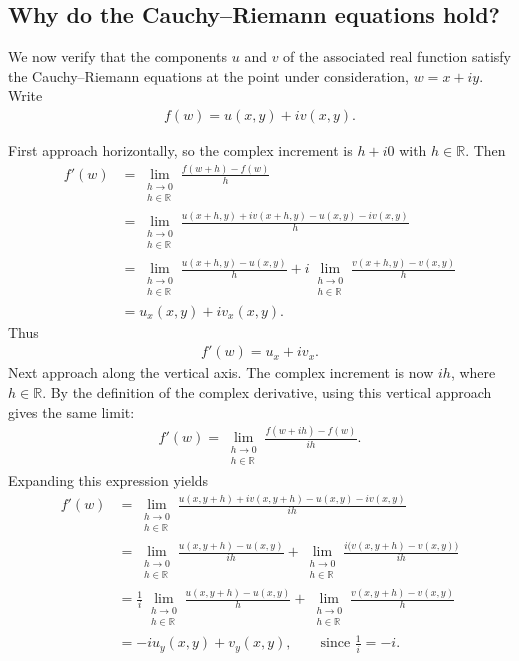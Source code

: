 \documentclass[11pt]{article}
\theoremstyle{plain}
\theoremstyle{definition}
\theoremstyle{remark}
\numberwithin{equation}{section}
\newcommand{\be}{\begin{eqnarray}}
\newcommand{\ee}{\end{eqnarray}}
\newcommand{\R}{\mathbb{R}}
\begin{document}
\subsection{Why do the Cauchy--Riemann equations hold?}
We now verify that the components $u$ and $v$ of the associated real
function satisfy the Cauchy--Riemann equations at the point under
consideration, $w=x+iy$. Write
\be
 f(w)=u(x,y)+iv(x,y).
\ee
\begin{center}
\end{center}
First approach horizontally, so the complex increment is $h+i0$ with
$h\in\R$. Then
\begin{align*}
 f'(w)
 &=\lim_{\substack{h\to0\\h\in\R}}\frac{f(w+h)-f(w)}{h}\\
 &=\lim_{\substack{h\to0\\h\in\R}}
 \frac{u(x+h,y)+iv(x+h,y)-u(x,y)-iv(x,y)}{h}\\
 &=\lim_{\substack{h\to0\\h\in\R}}
 \frac{u(x+h,y)-u(x,y)}{h}
 +i\lim_{\substack{h\to0\\h\in\R}}
 \frac{v(x+h,y)-v(x,y)}{h}\\
 &=u_x(x,y)+iv_x(x,y).
\end{align*}
Thus
\be
 \boxed{f'(w)=u_x+iv_x.}
\ee
Next approach along the vertical axis. The complex increment is now $ih$,
where $h\in\R$. By the definition of the complex derivative, using this
vertical approach gives the same limit:
\be
 f'(w)=\lim_{\substack{h\to0\\h\in\R}}
 \frac{f(w+ih)-f(w)}{ih}.
\ee
Expanding this expression yields
\begin{align*}
 f'(w)
 &=\lim_{\substack{h\to0\\h\in\R}}
 \frac{u(x,y+h)+iv(x,y+h)-u(x,y)-iv(x,y)}{ih}\\
 &=\lim_{\substack{h\to0\\h\in\R}}
 \frac{u(x,y+h)-u(x,y)}{ih}
 +\lim_{\substack{h\to0\\h\in\R}}
 \frac{i\bigl(v(x,y+h)-v(x,y)\bigr)}{ih}\\
 &=\frac1i\lim_{\substack{h\to0\\h\in\R}}
 \frac{u(x,y+h)-u(x,y)}{h}
 +\lim_{\substack{h\to0\\h\in\R}}
 \frac{v(x,y+h)-v(x,y)}{h}\\
 &=-iu_y(x,y)+v_y(x,y),\qquad\text{since }\frac1i=-i.
\end{align*}
\end{document}
